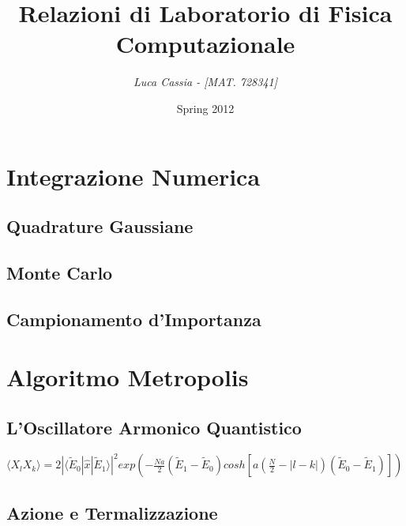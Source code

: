 \documentclass[a4paper,11pt]{report}
\title{\bfseries{\Huge{Relazioni di Laboratorio di Fisica Computazionale}}}
\author{\textit {Luca Cassia - [MAT. 728341]}}
\date{Spring 2012}
\begin{document}
\maketitle
\tableofcontents

\chapter{\huge Integrazione Numerica}

\section{Quadrature Gaussiane}
\section{Monte Carlo}
\section{Campionamento d'Importanza}

\chapter{\huge Algoritmo Metropolis}

\section{L'Oscillatore Armonico Quantistico}
\begin{center}
$\langle X_l X_k\rangle = 2|\langle\tilde{E}_0|\hat{x}|\tilde{E}_1\rangle|^2 exp\left(-\frac{Na}{2}(\tilde{E}_1-\tilde{E}_0)cosh\left[a\left(\frac{N}{2}-|l-k|\right)(\tilde{E}_0-\tilde{E}_1)\right]\right)$
\end{center}
\section{Azione e Termalizzazione}
\end{document}
